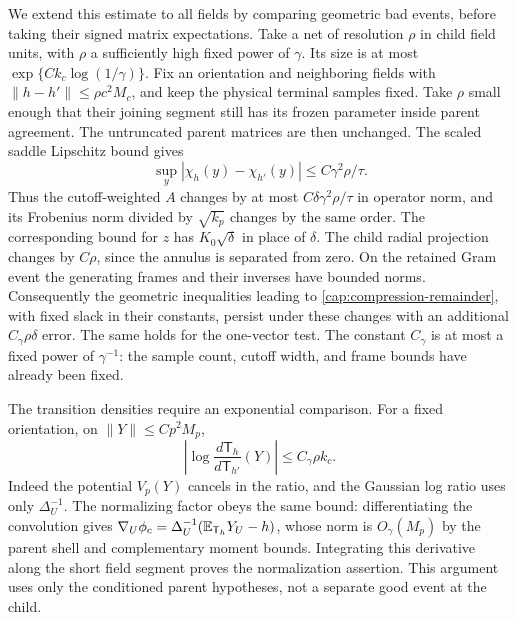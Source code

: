 We extend this estimate to all fields by comparing geometric bad events,
before taking their signed matrix expectations. Take a net of resolution
\(\rho\) in child field units, with \(\rho\) a sufficiently high fixed
power of \(\gamma\). Its size is at most
\(\exp\{C k_c\log(1/\gamma)\}\). Fix an orientation and neighboring
fields with \(\|h-h'\|\le\rho c^2M_c\), and keep the physical terminal
samples fixed. Take \(\rho\) small enough that their joining segment
still has its frozen parameter inside parent agreement. The untruncated
parent matrices are then unchanged. The
scaled saddle Lipschitz bound gives
\begin{equation}\label{cap:cutoff-continuity}
 \sup_y|\chi_h(y)-\chi_{h'}(y)|
       \le C\gamma^2\rho/\tau.
\end{equation}
Thus the cutoff-weighted \(A\) changes by at most
\(C\delta\gamma^2\rho/\tau\) in operator norm, and its Frobenius norm
divided by \(\sqrt{k_p}\) changes by the same order. The corresponding
bound for \(z\) has \(K_0\sqrt\delta\) in place of \(\delta\).
The child radial projection changes by \(C\rho\), since the annulus is
separated from zero. On the retained Gram event the generating frames and
their inverses have bounded norms. Consequently the geometric inequalities
leading to \eqref{cap:compression-remainder}, with fixed slack in their
constants, persist under these changes with an additional
\(C_\gamma\rho\delta\) error. The same holds for the one-vector test.
The constant \(C_\gamma\) is at most a fixed power of \(\gamma^{-1}\):
the sample count, cutoff width, and frame bounds have already been fixed.

The transition densities require an exponential comparison. For a fixed
orientation, on \(\|Y\|\le C p^2M_p\),
\begin{equation}\label{cap:field-likelihood-comparison}
 \left|\log\frac{d\mathsf T_h}{d\mathsf T_{h'}}(Y)\right|
       \le C_\gamma\rho k_c.
\end{equation}
Indeed the potential \(V_p(Y)\) cancels in the ratio, and the Gaussian
log ratio uses only \(\Delta_U^{-1}\). The normalizing factor obeys the
same bound: differentiating the convolution gives
\(\nabla_U\phi_c=\Delta_U^{-1}(\mathbb E_{\mathsf T_h}Y_U-h)\),
whose norm is \(O_\gamma(M_p)\) by the parent shell and complementary
moment bounds. Integrating this derivative along the short field segment
proves the normalization assertion. This argument uses only the conditioned
parent hypotheses, not a separate good event at the child.

